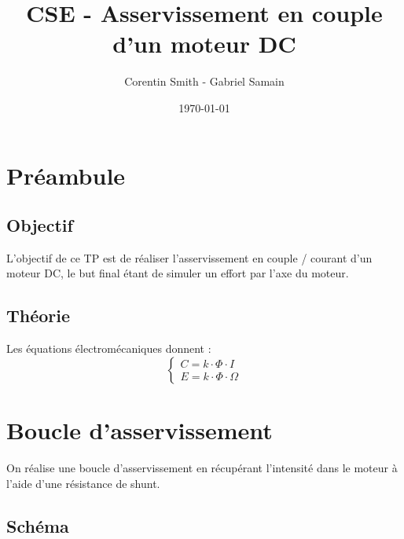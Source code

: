 \documentclass[a4paper]{article}
\title{CSE - Asservissement en couple d'un moteur DC}
\author{Corentin Smith - Gabriel Samain}
\date{\today}
\begin{document}
\maketitle


\section{Préambule}

\subsection{Objectif}

L'objectif de ce TP est de réaliser l'asservissement en couple / courant d'un moteur DC, le but final étant de simuler un effort par l'axe du moteur.

\subsection{Théorie}

Les équations électromécaniques donnent : 
$$
\begin{cases}
C = k \cdot \Phi \cdot I \\
E = k \cdot \Phi \cdot \Omega
\end{cases}
$$

\section{Boucle d'asservissement}

On réalise une boucle d’asservissement en récupérant l’intensité dans le moteur à l’aide d’une résistance de shunt.

\subsection{Schéma}

\begin{center}
\end{center}
\end{document}
